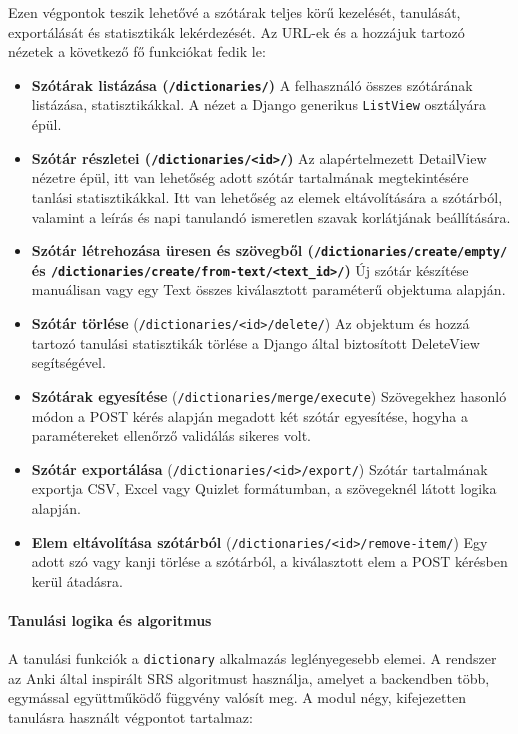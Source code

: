 Ezen végpontok teszik lehetővé a szótárak teljes körű kezelését, tanulását, exportálását és statisztikák lekérdezését. Az URL-ek és a hozzájuk tartozó nézetek a következő fő funkciókat fedik le:

\begin{itemize}
  \item \textbf{Szótárak listázása (\texttt{/dictionaries/})} A felhasználó összes szótárának listázása, statisztikákkal. A nézet a Django generikus \texttt{ListView} osztályára épül.
  \item \textbf{Szótár részletei (\texttt{/dictionaries/<id>/})} Az alapértelmezett DetailView nézetre épül, itt van lehetőség adott szótár tartalmának megtekintésére tanlási statisztikákkal. Itt van lehetőség az elemek eltávolítására a szótárból, valamint a leírás és napi tanulandó ismeretlen szavak korlátjának beállítására.
  \item \textbf{Szótár létrehozása üresen és szövegből (\texttt{/dictionaries/create/empty/} és \texttt{/dictionaries/create/from-text/<text\_id>/})}  Új szótár készítése manuálisan vagy egy Text összes kiválasztott paraméterű objektuma alapján.
  \item \textbf{Szótár törlése} (\texttt{/dictionaries/<id>/delete/}) Az objektum és hozzá tartozó tanulási statisztikák törlése a Django által biztosított DeleteView segítségével.
  \item \textbf{Szótárak egyesítése} (\texttt{/dictionaries/merge/execute}) Szövegekhez hasonló módon a POST kérés alapján megadott két szótár egyesítése, hogyha a paramétereket ellenőrző validálás sikeres volt.
  \item \textbf{Szótár exportálása} (\texttt{/dictionaries/<id>/export/}) Szótár tartalmának exportja CSV, Excel vagy Quizlet formátumban, a szövegeknél látott logika alapján.
  \item \textbf{Elem eltávolítása szótárból} (\texttt{/dictionaries/<id>/remove-item/})  Egy adott szó vagy kanji törlése a szótárból, a kiválasztott elem a POST kérésben kerül átadásra.
  
\end{itemize}

\paragraph{Tanulási logika és algoritmus}

A tanulási funkciók a \texttt{dictionary} alkalmazás leglényegesebb elemei. A rendszer az Anki által inspirált SRS algoritmust használja, amelyet a backendben több, egymással együttműködő függvény valósít meg. A modul négy, kifejezetten tanulásra használt végpontot tartalmaz:

